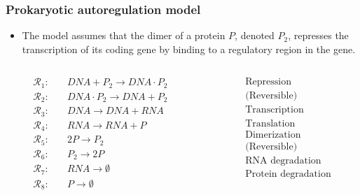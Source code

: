 \documentclass{beamer}
\begin{document}
    \begin{frame}[noframenumbering]
    \frametitle{Prokaryotic autoregulation model}
    \begin{itemize}
        \item The model assumes that the dimer of a protein $P$, denoted $P_2$, represses the transcription of its coding gene by binding to a regulatory region in the gene.
    \end{itemize}
    \begin{columns}
        \begin{column}{0.4\textwidth}
            \begin{equation*}
            \begin{split}
            \mathcal{R}_1:\quad & \mathit{DNA} + P_2 \to \mathit{DNA} \cdot P_2 \\
            \mathcal{R}_2:\quad & \mathit{DNA} \cdot P_2 \to \mathit{DNA} + P_2 \\
            \mathcal{R}_3:\quad & \mathit{DNA} \to \mathit{DNA} + \mathit{RNA} \\
            \mathcal{R}_4:\quad & \mathit{RNA} \to \mathit{RNA} + P \\
            \mathcal{R}_5:\quad & 2P \to P_2 \\
            \mathcal{R}_6:\quad & P_2 \to 2P \\
            \mathcal{R}_7:\quad & \mathit{RNA} \to \emptyset \\
            \mathcal{R}_8:\quad & P \to \emptyset
            \end{split}
            \end{equation*}
        \end{column}
%
        \begin{column}{0.4\textwidth}
            \begin{equation*}
            \begin{split}
            & \text{Repression} \\
            & \text{(Reversible)} \\
            & \text{Transcription} \\
            & \text{Translation} \\
            & \text{Dimerization} \\
            & \text{(Reversible)} \\
            & \text{RNA degradation} \\
            & \text{Protein degradation} \\
            \end{split}
            \end{equation*}
        \end{column}
    \end{columns}
    \end{frame}
\end{document}
